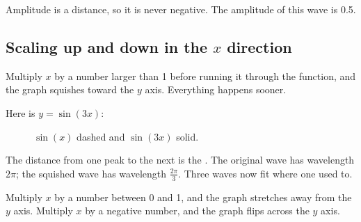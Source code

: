 Amplitude is a distance, so it is never negative. The amplitude of this
wave is 0.5.

\subsection{Scaling up and down in the $x$ direction}

Multiply $x$ by a number larger than 1 before running it through the
function, and the graph squishes toward the $y$ axis. Everything happens
sooner.

Here is $y = \sin(3x)$:
\begin{figure}[H]
    \centering
    \caption{$\sin(x)$ dashed and $\sin(3x)$ solid.}
    \label{fig:compressedSin}
\end{figure}

The distance from one peak to the next is the
. The original wave has wavelength
$2\pi$; the squished wave has wavelength $\frac{2\pi}{3}$. Three waves now
fit where one used to.

Multiply $x$ by a number between 0 and 1, and the graph stretches away from
the $y$ axis. Multiply $x$ by a negative number, and the graph flips across
the $y$ axis.


